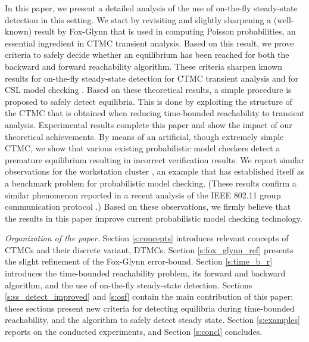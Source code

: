 \documentclass[times, 10pt,twocolumn]{article}
\begin{document}
In this paper, we present a detailed analysis of the use of on-the-fly steady-state detection in this
setting. 
We start by revisiting and slightly sharpening a (well-known) result by Fox-Glynn \cite{FoxG_ACM88} that is used in computing Poisson probabilities, an essential ingredient in CTMC transient analysis.
Based on this result, we prove criteria to safely decide whether an equilibrium has been reached 
for both the backward and forward reachability algorithm. 
These criteria sharpen known results for on-the-fly steady-state detection for CTMC transient 
analysis \cite{MalhotraMT_MR94} and for CSL model checking \cite{YounesKNP_TACAS04,%
YounesKNP_STTT05}.
Based on these theoretical results, a simple procedure is proposed to safely detect equilibria.
This is done by exploiting the structure of the CTMC that is obtained when reducing time-bounded reachability to transient analysis. 
Experimental results complete this paper and show the impact of our theoretical achievements. 
By means of an artificial, though extremely simple CTMC, we show that various existing
probabilistic model checkers detect a premature equilibrium resulting in incorrect verification
results.
We report similar observations for the workstation cluster \cite{HaverkortHK_SRDS00, BuchholzKKT_JLAP03, YounesKNP_TACAS04, KwiatkowskaNP_IMTTCPE02, Prism_WC05}, 
an example that has established itself as a benchmark problem for probabilistic model checking.
(These results confirm a similar phenomenon reported in a recent analysis of the IEEE 802.11 
group communication protocol \cite{MassinkKL_DSN04}.)
Based on these observations, we firmly believe that the results in this paper improve current
probabilistic model checking technology.

\emph{Organization of the paper.} 
Section \ref{s:concepts} introduces relevant concepts of CTMCs and their discrete variant, DTMCs. 
Section \ref{s:fox_glynn_ref} presents the slight refinement of the Fox-Glynn error-bound. 
Section \ref{s:time_b_r} introduces the time-bounded reachability problem, its forward and
backward algorithm, and the use of on-the-fly steady-state detection. 
Sections \ref{s:ss_detect_improved} and \ref{s:osf} contain the main contribution of this paper;
these sections present new criteria for detecting equilibria during time-bounded reachability,
and the algorithm to safely detect steady state.    
Section \ref{s:examples} reports on the conducted experiments, and Section \ref{s:concl} concludes.

{}
\end{document}
